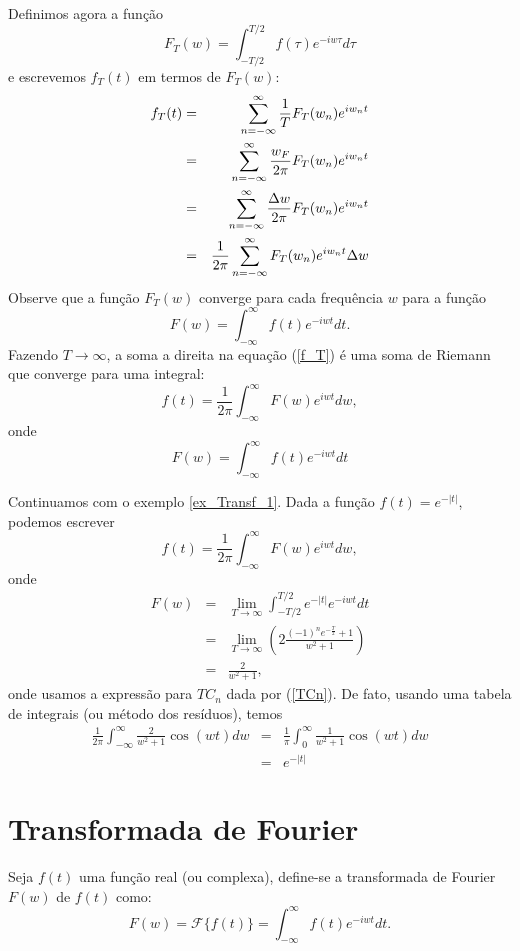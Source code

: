 Definimos agora a função $$F_T(w)=\int_{-T/2}^{T/2}f(\tau)e^{-iw \tau}d\tau$$ e escrevemos $f_T(t)$ em termos de $F_T(w)$:
\begin{eqnarray}
\nonumber f_T(t)&=&\sum_{n=-\infty}^\infty \frac{1}{T}F_T(w_n) e^{i w_n t}\\&=& \sum_{n=-\infty}^\infty \frac{w_F}{2\pi}F_T(w_n) e^{i w_n t}
\\\nonumber &=& \sum_{n=-\infty}^\infty \frac{\Delta w}{2\pi}F_T(w_n) e^{i w_n t}
\\{\label{f_T}}&=&\frac{1}{2\pi} \sum_{n=-\infty}^\infty F_T(w_n) e^{i w_n t}\Delta w
\end{eqnarray}
Observe que a função $F_T(w)$ converge para cada frequência $w$ para a função 
$$
F(w)=\int_{-\infty}^\infty f(t) e^{-iw t}dt.
$$
Fazendo $T\to \infty$, a soma a direita na equação (\ref{f_T}) é uma soma de Riemann que converge para uma integral:
$$
f(t)=\frac{1}{2\pi} \int_{-\infty}^\infty F(w)e^{iw t}dw,
$$
onde
$$F(w)=\int_{-\infty}^{\infty}f(t)e^{-i w t}dt$$

\begin{ex} Continuamos com o exemplo \ref{ex_Transf_1}. Dada a função $f(t)=e^{-|t|}$, podemos escrever
$$
f(t)=\frac{1}{2\pi} \int_{-\infty}^\infty F(w)e^{iw t}dw,
$$
onde
\begin{eqnarray*}
F(w)&=&\lim_{T\to\infty}\int_{-T/2}^{T/2}e^{-|t|} e^{-i w t}dt\\
&=&\lim_{T\to\infty}\left(2\frac{ (-1)^ne^{-\frac{T}{2}}+1}{w^2+1} \right)\\
&=&\frac{2}{w^2+1},
\end{eqnarray*}
onde usamos a expressão para $TC_n$ dada por (\ref{TCn}). De fato, usando uma tabela de integrais (ou método dos resíduos), temos
\begin{eqnarray}
\frac{1}{2\pi} \int_{-\infty}^\infty \frac{2}{w^2+1} \cos(wt)dw
&=&\frac{1}{\pi} \int_{0}^\infty \frac{1}{w^2+1} \cos(wt)dw\\
&=&e^{-|t|}
\end{eqnarray}
\end{ex}

\section{Transformada de Fourier}

\begin{defn}Seja $f(t)$ uma função real (ou complexa), define-se a transformada de Fourier $F(w)$ de $f(t)$ como:
$$
F(w)=\mathcal{F}\{f(t)\}=\int_{-\infty}^\infty f(t)e^{-iwt}dt.
$$
\end{defn}


